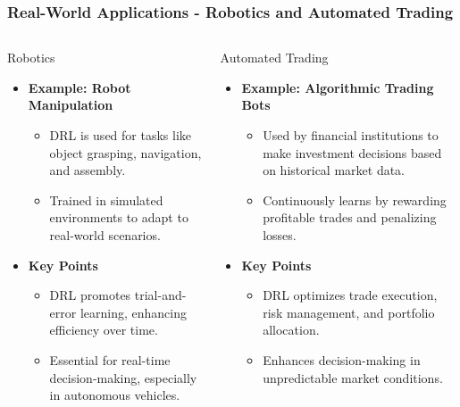 \documentclass[aspectratio=169]{beamer}
\begin{document}
\begin{frame}[fragile]
    \frametitle{Real-World Applications - Robotics and Automated Trading}
    \begin{columns}
            \begin{block}{Robotics}
                \begin{itemize}
                    \item \textbf{Example: Robot Manipulation}
                        \begin{itemize}
                            \item DRL is used for tasks like object grasping, navigation, and assembly.
                            \item Trained in simulated environments to adapt to real-world scenarios.
                        \end{itemize}
                    \item \textbf{Key Points}
                        \begin{itemize}
                            \item DRL promotes trial-and-error learning, enhancing efficiency over time.
                            \item Essential for real-time decision-making, especially in autonomous vehicles.
                        \end{itemize}
                \end{itemize}
            \end{block}
            \begin{block}{Automated Trading}
                \begin{itemize}
                    \item \textbf{Example: Algorithmic Trading Bots}
                        \begin{itemize}
                            \item Used by financial institutions to make investment decisions based on historical market data.
                            \item Continuously learns by rewarding profitable trades and penalizing losses.
                        \end{itemize}
                    \item \textbf{Key Points}
                        \begin{itemize}
                            \item DRL optimizes trade execution, risk management, and portfolio allocation.
                            \item Enhances decision-making in unpredictable market conditions.
                        \end{itemize}
                \end{itemize}
            \end{block}
        \end{columns}
\end{frame}
\end{document}
